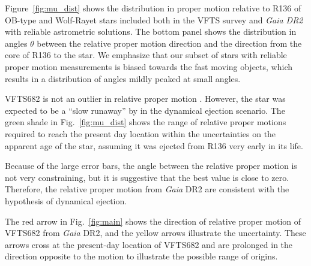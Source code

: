 \documentclass[apjl,twocolumn]{emulateapj}
\DeclareRobustCommand{\Eqref}[1]{Eq.~\ref{#1}}
\DeclareRobustCommand{\Figref}[1]{Fig.~\ref{#1}}
\begin{document}

Figure~\ref{fig:mu_dist} shows the distribution in proper motion relative to R136
of OB-type and Wolf-Rayet stars included both in the VFTS survey and
\emph{Gaia DR2} with reliable astrometric solutions. The bottom panel
shows the distribution in angles $\theta$ between the relative proper motion
direction and the direction from the core of R136 to the star. We
emphasize that our subset of stars with reliable proper motion
measurements is biased towards the fast moving objects, which results in a
distribution of angles mildly peaked at small angles.

VFTS682 is not an outlier in relative proper motion%
. However, the star was expected to be a ``slow runaway'' by \citet{bestenlehner:11} in
the dynamical ejection scenario. The green shade in
\Figref{fig:mu_dist} shows the range of relative proper motions
required to reach the present day location within
the uncertainties on the apparent age of the star, assuming it was
ejected from R136 very early in its life.

Because of the large
error bars, the angle between the relative proper motion is not very
constraining, but it is suggestive that the best value is close to zero.
Therefore, the relative proper motion from \emph{Gaia} DR2 are consistent with the hypothesis
of dynamical ejection.





The red arrow in \Figref{fig:main} shows the direction of relative proper motion of
VFTS682 from \emph{Gaia} DR2, and the
yellow arrows illustrate the uncertainty. %
These arrows cross at the present-day location of VFTS682 and
are prolonged in the direction opposite to the motion to illustrate
the possible range of origins. %

\end{document}

